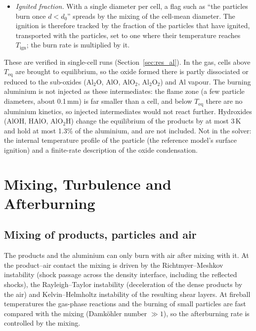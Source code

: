 \documentclass{article}
\begin{document}
\begin{itemize}
    \item \emph{Ignited fraction.} With a single diameter per cell, a flag such as ``the particles burn once $d < d_0$'' spreads by the mixing of the cell-mean diameter. The ignition is therefore tracked by the fraction of the particles that have ignited, transported with the particles, set to one where their temperature reaches $T_\text{ign}$; the burn rate is multiplied by it.
\end{itemize}
These are verified in single-cell runs (Section~\ref{sec:res_al}). In the gas, cells above $T_\text{eq}$ are brought to equilibrium, so the oxide formed there is partly dissociated or reduced to the sub-oxides (Al$_2$O, AlO, AlO$_2$, Al$_2$O$_2$) and Al vapour. The burning aluminium is not injected as these intermediates: the flame zone (a few particle diameters, about 0.1\,mm) is far smaller than a cell, and below $T_\text{eq}$ there are no aluminium kinetics, so injected intermediates would not react further. Hydroxides (AlOH, HAlO, AlO$_2$H) change the equilibrium of the products by at most 3\,K and hold at most 1.3\% of the aluminium, and are not included. Not in the solver: the internal temperature profile of the particle (the reference model's surface ignition) and a finite-rate description of the oxide condensation.

\section{Mixing, Turbulence and Afterburning}
\label{sec:mixing}

\subsection{Mixing of products, particles and air}

The products and the aluminium can only burn with air after mixing with it. At the product--air contact the mixing is driven by the Richtmyer--Meshkov instability (shock passage across the density interface, including the reflected shocks), the Rayleigh--Taylor instability (deceleration of the dense products by the air) and Kelvin--Helmholtz instability of the resulting shear layers. At fireball temperatures the gas-phase reactions and the burning of small particles are fast compared with the mixing (Damk\"ohler number $\gg 1$), so the afterburning rate is controlled by the mixing.
\end{document}
